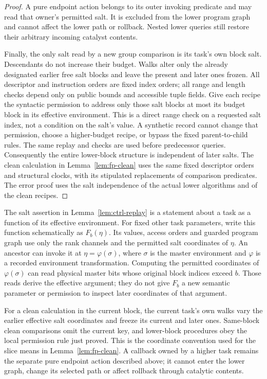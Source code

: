 \begin{proof}
A pure endpoint action belongs to its outer invoking predicate and may
read that owner's permitted salt.  It is excluded from the lower program
graph and cannot affect the lower path or rollback.  Nested lower queries
still restore their arbitrary incoming catalyst contents.

Finally, the only salt read by a new group comparison is its task's
own block salt.  Descendants do not increase their budget.  Walks alter
only the already designated earlier free salt blocks and leave the
present and later ones frozen.  All descriptor and instruction orders
are fixed index orders; all range and length checks depend only on
public bounds and accessible tuple fields.  Give each recipe the
syntactic permission to address only those salt blocks at most its
budget block in its effective environment.  This is a direct range check
on a requested salt index,
not a condition on the salt's value.  A synthetic record cannot change
that permission, choose a higher-budget recipe, or bypass the fixed
parent-to-child rules.  The same replay and checks are used before
predecessor queries.  Consequently the entire lower-block structure is
independent of later salts.  The clean calculation in
Lemma~\ref{lem:fp-clean} uses the same fixed descriptor orders and
structural clocks, with its stipulated replacements of comparison
predicates.  The error proof uses the salt independence of the actual lower
algorithms and of the clean recipes.
\end{proof}

\begin{remark}
\label{rem:ctrl-effective-environment}
The salt assertion in Lemma~\ref{lem:ctrl-replay} is a statement about a
task as a function of its effective environment.  For fixed other task
parameters, write this function schematically as $F_b(\eta)$.  Its
values, access orders and guarded program graph use only the rank
channels and the permitted salt coordinates of $\eta$.  An ancestor can
invoke it at $\eta=\varphi(\sigma)$, where $\sigma$ is the master
environment and $\varphi$ is a recorded environment transformation.
Computing the permitted coordinates of $\varphi(\sigma)$ can read
physical master bits whose original block indices exceed $b$.  Those
reads derive the effective argument; they do not give $F_b$ a new
semantic parameter or permission to inspect later coordinates of that
argument.

For a clean calculation in the current block, the current task's own
walks vary the earlier effective salt coordinates and freeze its current
and later ones.  Same-block clean comparisons omit the current key, and
lower-block procedures obey the local permission rule just proved.
This is the coordinate convention used for the slice means in
Lemma~\ref{lem:fp-clean}.  A callback owned by a higher task remains the
separate pure endpoint action described above; it cannot enter the lower
graph, change its selected path or affect rollback through catalytic
contents.
\end{remark}

